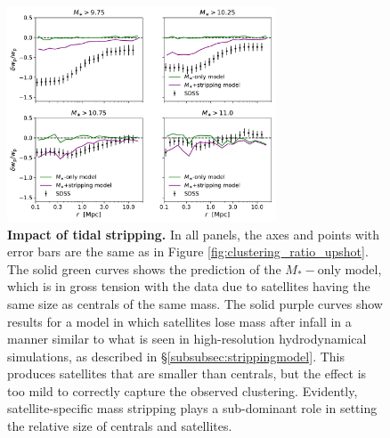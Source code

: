 \documentclass[usenatbib,usegraphicx,letterpaper]{mn2e}
\newcommand{\mstar}{M_{\ast}}
\begin{document}
\begin{figure}
\centering
\includegraphics[width=8cm]{FIGS/alt_model_wp_ratios.pdf}
\caption{
{\bf Impact of tidal stripping.} 
In all panels, the axes and points with error bars are the same as in Figure \ref{fig:clustering_ratio_upshot}. The solid green curves shows the prediction of the $\mstar-$only model, which is in gross tension with the data due to satellites having the same size as centrals of the same mass. The solid purple curves show results for a model in which satellites lose mass after infall in a manner similar to what is seen in high-resolution hydrodynamical simulations, as described in \S\ref{subsubsec:strippingmodel}. This produces satellites that are smaller than centrals, but the effect is too mild to correctly capture the observed clustering. Evidently, satellite-specific mass stripping plays a sub-dominant role in setting the relative size of centrals and satellites. 
}
\label{fig:strippingorphans}
\end{figure}
\end{document}
